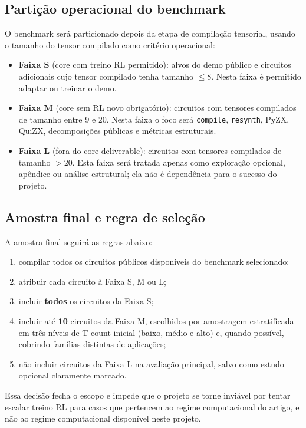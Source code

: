 \documentclass[a4paper,11pt]{article}
\begin{document}
\subsection*{Partição operacional do benchmark}

O benchmark será particionado depois da etapa de compilação tensorial, usando o tamanho do tensor compilado como critério operacional:

\begin{itemize}
  \item \textbf{Faixa S} (core com treino RL permitido): alvos do demo público e circuitos adicionais cujo tensor compilado tenha tamanho $\leq 8$. Nesta faixa é permitido adaptar ou treinar o demo.
  \item \textbf{Faixa M} (core sem RL novo obrigatório): circuitos com tensores compilados de tamanho entre $9$ e $20$. Nesta faixa o foco será \texttt{compile}, \texttt{resynth}, PyZX, QuiZX, decomposições públicas e métricas estruturais.
  \item \textbf{Faixa L} (fora do core deliverable): circuitos com tensores compilados de tamanho $>20$. Esta faixa será tratada apenas como exploração opcional, apêndice ou análise estrutural; ela não é dependência para o sucesso do projeto.
\end{itemize}

\subsection*{Amostra final e regra de seleção}

A amostra final seguirá as regras abaixo:
\begin{enumerate}
  \item compilar todos os circuitos públicos disponíveis do benchmark selecionado;
  \item atribuir cada circuito à Faixa S, M ou L;
  \item incluir \textbf{todos} os circuitos da Faixa S;
  \item incluir até \textbf{10} circuitos da Faixa M, escolhidos por amostragem estratificada em três níveis de T-count inicial (baixo, médio e alto) e, quando possível, cobrindo famílias distintas de aplicações;
  \item não incluir circuitos da Faixa L na avaliação principal, salvo como estudo opcional claramente marcado.
\end{enumerate}

Essa decisão fecha o escopo e impede que o projeto se torne inviável por tentar escalar treino RL para casos que pertencem ao regime computacional do artigo, e não ao regime computacional disponível neste projeto.
\end{document}
